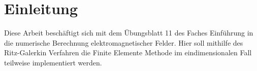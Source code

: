 \chapter{Einleitung}\label{sec:intro}
Diese Arbeit beschäftigt sich mit dem Übungsblatt 11 des Faches \glqq Einführung in die numerische Berechnung elektromagnetischer Felder\grqq{}.
Hier soll mithilfe des Ritz-Galerkin Verfahren die Finite Elemente Methode im eindimensionalen Fall teilweise implementiert werden. 